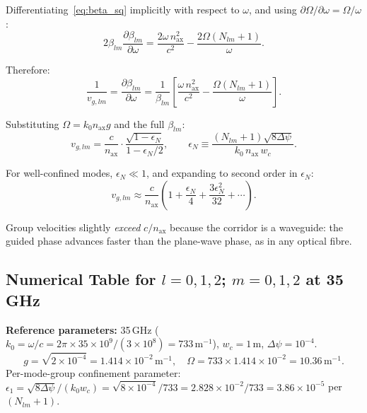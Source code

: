 \documentclass[aps,prd,twocolumn,superscriptaddress]{revtex4-2}
\begin{document}
Differentiating~\eqref{eq:beta_sq} implicitly with respect to $\omega$,
and using $\partial\Omega/\partial\omega = \Omega/\omega$:
\begin{equation}
2\beta_{lm}\frac{\partial\beta_{lm}}{\partial\omega}
= \frac{2\omega\,n_\mathrm{ax}^2}{c^2}
  - \frac{2\Omega(N_{lm}+1)}{\omega}.
\end{equation}

Therefore:
\begin{equation}
\frac{1}{v_{g,lm}} = \frac{\partial\beta_{lm}}{\partial\omega}
= \frac{1}{\beta_{lm}}\left[\frac{\omega\,n_\mathrm{ax}^2}{c^2}
  - \frac{\Omega(N_{lm}+1)}{\omega}\right].
\label{eq:inv_vg}
\end{equation}

Substituting $\Omega = k_0 n_\mathrm{ax} g$ and the full $\beta_{lm}$:
\begin{equation}
\boxed{
v_{g,lm} = \frac{c}{n_\mathrm{ax}}\cdot
\frac{\sqrt{1 - \epsilon_N}}
{1 - \epsilon_N/2},
\qquad
\epsilon_N \equiv \frac{(N_{lm}+1)\sqrt{8\Delta\psi}}{k_0\,n_\mathrm{ax}\,w_c}.
}
\label{eq:vg_exact}
\end{equation}

For well-confined modes, $\epsilon_N \ll 1$, and expanding to
second order in $\epsilon_N$:
\begin{equation}
v_{g,lm} \approx \frac{c}{n_\mathrm{ax}}
\left(1 + \frac{\epsilon_N}{4} + \frac{3\epsilon_N^2}{32} + \cdots\right).
\label{eq:vg_approx}
\end{equation}

Group velocities slightly \emph{exceed} $c/n_\mathrm{ax}$ because the
corridor is a waveguide: the guided phase advances faster than the
plane-wave phase, as in any optical fibre.

\subsection{Numerical Table for $l = 0,1,2$; $m = 0,1,2$ at 35\,GHz}

\textbf{Reference parameters:} 35\,GHz ($k_0 = \omega/c = 2\pi\times35
\times10^9/(3\times10^8) = 733\,\mathrm{m}^{-1}$), $w_c = 1\,\mathrm{m}$,
$\Delta\psi = 10^{-4}$.
\begin{equation}
g = \sqrt{2\times10^{-4}} = 1.414\times10^{-2}\,\mathrm{m}^{-1},
\quad
\Omega = 733\times1.414\times10^{-2} = 10.36\,\mathrm{m}^{-1}.
\end{equation}
Per-mode-group confinement parameter:
$\epsilon_1 = \sqrt{8\Delta\psi}/(k_0 w_c) = \sqrt{8\times10^{-4}}/733
= 2.828\times10^{-2}/733 = 3.86\times10^{-5}$ per $(N_{lm}+1)$.
\end{document}
